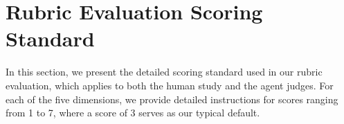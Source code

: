 \section{Rubric Evaluation Scoring Standard}
In this section, we present the detailed scoring standard used in our rubric evaluation, which applies to both the human study and the agent judges. For each of the five dimensions, we provide detailed instructions for scores ranging from 1 to 7, where a score of 3 serves as our typical default.

\label{sec:app:rubric}

\providecommand{\promptsec}[1]{%
  \par\medskip{\color{prompttitle}\bfseries\large #1}\par\smallskip}
\providecommand{\promptsub}[1]{%
  \par\smallskip{\color{prompttitle}\bfseries #1}\par\smallskip}
\providecommand{\promptnote}[1]{%
  \par\smallskip\begin{quote}\itshape #1\end{quote}\par}

